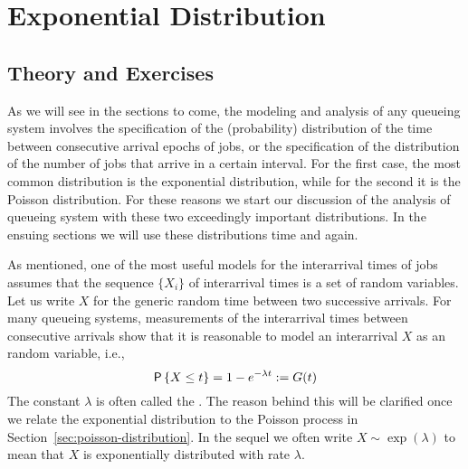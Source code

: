 \section{Exponential Distribution}
\label{sec:expon-distr}

\subsection*{Theory and Exercises}
\label{sec:exercises}



As we will see in the sections to come, the modeling and analysis of
any queueing system involves the specification of the (probability)
distribution of the time between consecutive arrival epochs of jobs,
or the specification of the distribution of the number of jobs that
arrive in a certain interval.  For the first case, the most common
distribution is the exponential distribution, while for the second it
is the Poisson distribution.  For these reasons we start our
discussion of the analysis of queueing system with these two
exceedingly important distributions. In the ensuing sections we will
use these distributions time and again.

As mentioned, one of the most useful models for the interarrival
times of jobs assumes that the sequence $\{X_i\}$ of interarrival
times is a set of   random variables.  Let us write $X$ for the generic
random time between two successive arrivals. For many queueing
systems, measurements of the interarrival times between consecutive
arrivals show that it is reasonable to model an interarrival $X$ as
an  random variable, i.e.,
\begin{equation*}
  \P{X \leq t} = 1- e^{-\lambda t} := G(t)
\end{equation*}
The constant $\lambda$ is often called the . The reason
behind this will be clarified once we relate the exponential
distribution to the Poisson process in
Section~\ref{sec:poisson-distribution}.  In the sequel we often write
$X\sim \exp(\lambda)$ to mean that $X$ is exponentially distributed
with rate $\lambda$.

